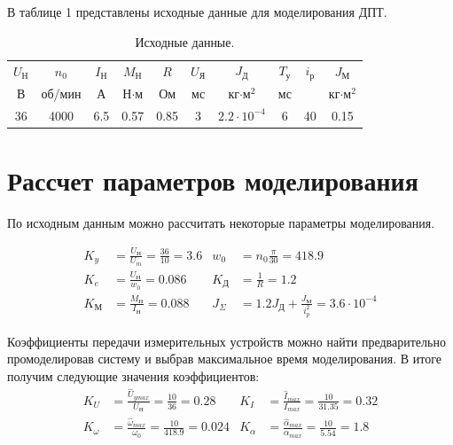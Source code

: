 \documentclass[a4paper, 12pt]{article}
\begin{document}
В таблице 1 представлены исходные данные для моделирования ДПТ.
\begin{table}[h!]
    \centering
    \begin{threeparttable}
        \caption{Исходные данные.}
        \begin{tabular}{|c|c|c|c|c|c|c|c|c|c|}
            \hline
            $U_\text{Н}$ & $n_0$ & $I_\text{Н}$ & $M_\text{Н}$ & $R$ & $U_\text{Я}$ & $J_\text{Д}$ & $T_\text{у}$ & $i_\text{р}$ & $J_\text{М}$\\
            В & об/мин & А & Н$\cdot$м & Ом & мс & кг$\cdot\text{м}^2$ & мс & &  кг$\cdot\text{м}^2$ \\ \hline
            36 & 4000 & 6.5 & 0.57 & 0.85 & 3 & $2.2\cdot10^{-4}$ & 6 & 40 & 0.15 \\
            \hline
        \end{tabular}
    \end{threeparttable}
\end{table}

\newpage
\section{Рассчет параметров моделирования}

По исходным данным можно рассчитать некоторые параметры моделирования.\par
\begin{align*}
    K_y & = \frac{U_\text{Н}}{U_m} = \frac{36}{10} = 3.6 & w_0 & = n_0\frac{\pi}{30} = 418.9 \\
    K_e & = \frac{U_\text{Н}}{w_0} = 0.086 & K_\text{Д} & = \frac{1}{R} = 1.2 \\
    K_\text{М} & = \frac{M_\text{Н}}{I_\text{Н}} =  0.088 & J_{\Sigma} & = 1.2J_\text{Д} + \frac{J_\text{М}}{i^2_p} = 3.6 \cdot 10^{-4}
\end{align*} \par
Коэффициенты передачи измерительных устройств можно найти предварительно промоделировав систему и выбрав максимальное время моделирования. В итоге получим следующие значения коэффициентов: 
\begin{align*}
    K_U & = \frac{\hat{U}_{ymax}}{U_\text{Н}} = \frac{10}{36} = 0.28  & K_I & = \frac{\hat{I}_{max}}{I_{max}} = \frac{10}{31.35} =  0.32\\
    K_\omega & = \frac{\hat{\omega}_{max}}{\omega_0} = \frac{10}{418.9} = 0.024 & K_\alpha & = \frac{\hat{\alpha}_{max}}{\alpha_{max}} = \frac{10}{5.54} = 1.8
\end{align*}
\end{document}
